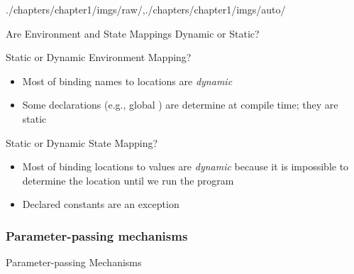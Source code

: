 \begin{graphicspathcontext}{{./chapters/chapter1/imgs/raw/},{./chapters/chapter1/imgs/auto/}}
\begin{bibunit}[apalike]
\begin{frame}{{}{Are Environment and State Mappings Dynamic or Static?}}
	\vspace{.5cm}
	\begin{block}{Static or Dynamic Environment Mapping?}
	\begin{itemize}
	\item Most of binding names to locations are \emph{dynamic}
	\item Some declarations (e.g., global ) are determine at compile time; they are static
	\end{itemize}
	\end{block}
	\vspace{.5cm}
	\begin{block}{Static or Dynamic State Mapping?}
	\begin{itemize}
	\item Most of binding locations to values are \emph{dynamic} because it is impossible to determine the location until we run the program
	\item Declared constants are an exception
	\end{itemize}
	\end{block}
\end{frame}

\subsubsection{Parameter-passing mechanisms}

\begin{frame}{{Parameter-passing} Mechanisms}
	\vspace{1cm}
	\vspace{1cm}
	\begin{columns}
		\begin{column}{.33\linewidth}
		\end{column}
		\begin{column}{.33\linewidth}
		\end{column}
		\begin{column}{.33\linewidth}
		\end{column}
	\end{columns}
\end{frame}


\end{bibunit}
\end{graphicspathcontext}
